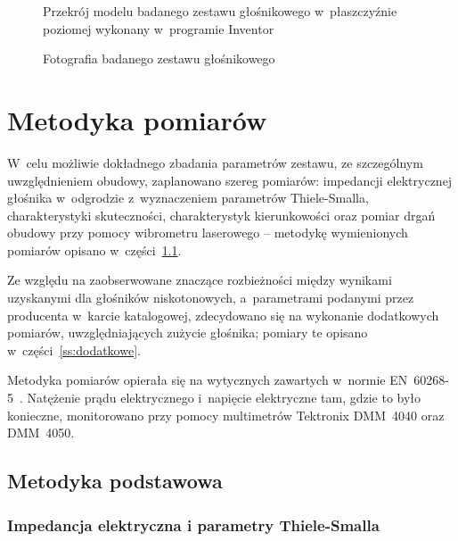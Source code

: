 \documentclass[12pt]{oska}
\begin{document}
	
	\begin{figure}[!h]
		\centering
		\caption{Przekrój modelu badanego zestawu głośnikowego w~płaszczyźnie poziomej wykonany w~programie Inventor}
		\label{r:przekroj}
	\end{figure}
	
	\begin{figure}[!h]
		\centering
		\caption{Fotografia badanego zestawu głośnikowego}
		\label{r:zdjecie}
	\end{figure}
	


\section{Metodyka pomiarów}

	W~celu możliwie dokładnego zbadania parametrów zestawu, ze szczególnym uwzględnieniem obudowy, zaplanowano szereg pomiarów: impedancji elektrycznej głośnika w~odgrodzie z~wyznaczeniem parametrów Thiele-Smalla, charakterystyki skuteczności, charakterystyk kierunkowości oraz pomiar drgań obudowy przy pomocy wibrometru laserowego -- metodykę wymienionych pomiarów opisano w~części~\ref{ss:metodyka}.
	
	Ze względu na zaobserwowane znaczące rozbieżności między wynikami uzyskanymi dla głośników niskotonowych, a~parametrami podanymi przez producenta w~karcie katalogowej, zdecydowano się na wykonanie dodatkowych pomiarów, uwzględniających zużycie głośnika; pomiary te opisano w~części~\ref{ss:dodatkowe}.
	
	Metodyka pomiarów opierała się na wytycznych zawartych w~normie EN~60268-5~\cite{norma}. Natężenie prądu elektrycznego i~napięcie elektryczne tam, gdzie to było konieczne, monitorowano przy pomocy multimetrów Tektronix DMM~4040 oraz DMM~4050.

	\subsection{Metodyka podstawowa}\label{ss:metodyka}
	
		\subsubsection{Impedancja elektryczna i parametry Thiele-Smalla}
			
\end{document}
